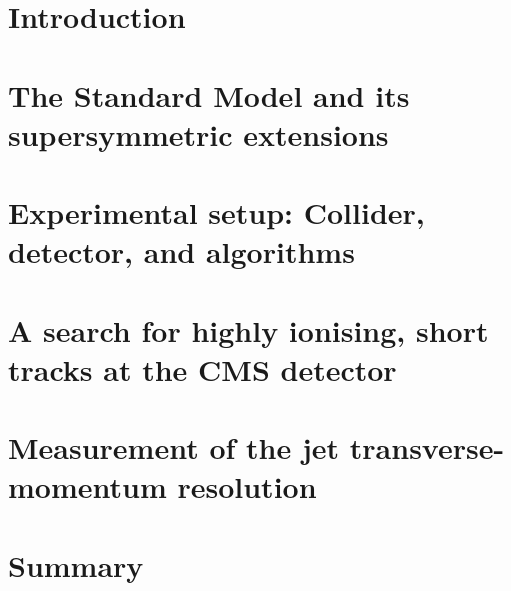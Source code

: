 \documentclass[
twoside=true,
headsepline,     %
headings=normal,
open=right,
numbers=noenddot, %
a4paper,
11pt
]{scrreprt} %
\author{Teresa Lenz}
\begin{document}





\tableofcontents \cleardoublepage


\setcounter{page}{1}
\part{Introduction}  \label{part:Introduction}


\part{The Standard Model and its supersymmetric extensions} \label{part:Theory}


\part{Experimental setup: Collider, detector, and algorithms} \label{part:Experiment}


 \part{A search for highly ionising, short tracks at the CMS detector}  \label{part:analysis}
 
 
 
 
 
 
 
 
 
 

 \part{Measurement of the jet transverse-momentum resolution} \label{part:resolution}
 

\part{Summary} \label{part:Summary}


\newpage
\thispagestyle{empty}
\quad
\cleardoublepage
\thispagestyle{empty}

 \cleardoublepage  \appendix {}  

\cleardoublepage 
{}
{}




\part*{~}
\ohead{~}

\cleardoublepage

\cleardoublepage

\end{document}
